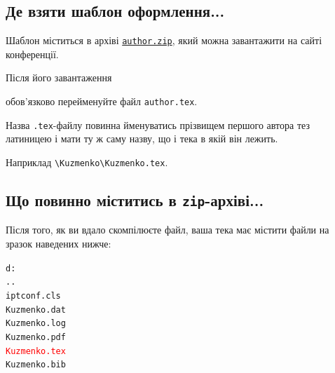 \documentclass[]{iptconf}
\def\templateurl{%
\href{https://drive.google.com/file/d/1YrrTXnwaIcydBJLFS5BM6uj-yosnkRl3/view}%
{\texttt{author.zip}}}
\begin{document}

\subsection*{Де взяти шаблон оформлення...}

Шаблон міститься в архіві \templateurl, який можна завантажити на сайті конференції.


Після його завантаження
\begin{tcolorbox}[breakable,enhanced,arc=0mm,colback=gray!5,colframe=red!80!black,leftrule=2mm]
	обов'язково перейменуйте файл \texttt{author.tex}.
\end{tcolorbox}

Назва \texttt{.tex}-файлу повинна йменуватись прізвищем першого автора тез латиницею і мати ту ж саму назву, що і тека в якій він лежить.

Наприклад \texttt{\textbackslash Kuzmenko\textbackslash Kuzmenko.tex}.

\subsection*{Що повинно міститись в \texttt{zip}-архіві...}

Після того, як ви вдало скомпілюєте файл, ваша тека має містити файли на зразок наведених нижче:

\begin{tcolorbox}[boxrule=0mm, sharpish  corners]
	\texttt{d:\string\Kuzmenko}\\
	\texttt{..}\\
	\texttt{iptconf.cls}\\
	\texttt{Kuzmenko.dat}\\
	\texttt{Kuzmenko.log}\\
	\texttt{Kuzmenko.pdf}\\
	\texttt{\textcolor{red}{Kuzmenko.tex}}\\
	\texttt{Kuzmenko.bib}
\end{tcolorbox}
\end{document}
